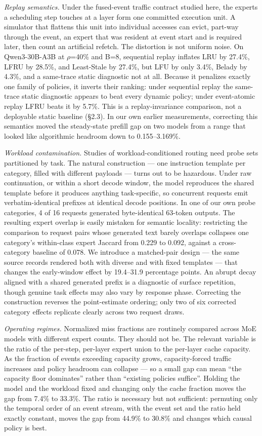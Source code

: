 \documentclass[
  10pt,
  letterpaper,
  10pt]{article}
\begin{document}
\emph{Replay semantics.} Under the fused-event traffic contract studied
here, the experts a scheduling step touches at a layer form one
committed execution unit. A simulator that flattens this unit into
individual accesses can evict, part-way through the event, an expert
that was resident at event start and is required later, then count an
artificial refetch. The distortion is not uniform noise. On
Qwen3-30B-A3B at \(\rho\)=40\% and B=8, sequential replay inflates LRU
by 27.4\%, LFRU by 28.5\%, and Least-Stale by 27.4\%, but LFU by only
3.4\%, Belady by 4.3\%, and a same-trace static diagnostic not at all.
Because it penalizes exactly one family of policies, it inverts their
ranking: under sequential replay the same-trace static diagnostic
appears to beat every dynamic policy; under event-atomic replay LFRU
beats it by 5.7\%. This is a replay-invariance comparison, not a
deployable static baseline (§2.3). In our own earlier measurements,
correcting this semantics moved the steady-state prefill gap on two
models from a range that looked like algorithmic headroom down to
0.155--3.169\%.

\emph{Workload contamination.} Studies of workload-conditioned routing
need probe sets partitioned by task. The natural construction --- one
instruction template per category, filled with different payloads ---
turns out to be hazardous. Under raw continuation, or within a short
decode window, the model reproduces the shared template before it
produces anything task-specific, so concurrent requests emit
verbatim-identical prefixes at identical decode positions. In one of our
own probe categories, 4 of 16 requests generated byte-identical 63-token
outputs. The resulting expert overlap is easily mistaken for semantic
locality: restricting the comparison to request pairs whose generated
text barely overlaps collapses one category's within-class expert
Jaccard from 0.229 to 0.092, against a cross-category baseline of 0.078.
We introduce a matched-pair design --- the same source records rendered
both with diverse and with fixed templates --- that changes the
early-window effect by 19.4--31.9 percentage points. An abrupt decay
aligned with a shared generated prefix is a diagnostic of surface
repetition, though genuine task effects may also vary by response phase.
Correcting the construction reverses the point-estimate ordering; only
two of six corrected category effects replicate clearly across two
request draws.

\emph{Operating regimes.} Normalized miss fractions are routinely
compared across MoE models with different expert counts. They should not
be. The relevant variable is the ratio of the per-step, per-layer expert
union to the per-layer cache capacity. As the fraction of events
exceeding capacity grows, capacity-forced traffic increases and policy
headroom can collapse --- so a small gap can mean ``the capacity floor
dominates'' rather than ``existing policies suffice''. Holding the model
and the workload fixed and changing only the cache fraction moves the
gap from 7.4\% to 33.3\%. The ratio is necessary but not sufficient:
permuting only the temporal order of an event stream, with the event set
and the ratio held exactly constant, moves the gap from 44.9\% to 30.8\%
and changes which causal policy is best.
\end{document}
